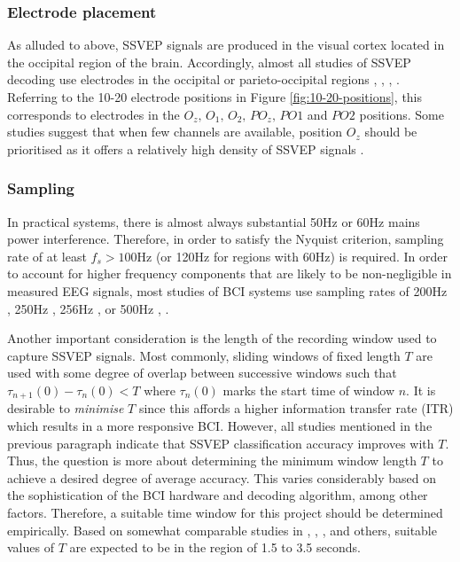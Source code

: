 \subsubsection{Electrode placement}
As alluded to above, SSVEP signals are produced in the visual cortex located in the occipital region of the brain. Accordingly, almost all studies of SSVEP decoding use electrodes in the occipital or parieto-occipital regions \cite{autthasan-single-chan-ssvep}, \cite{acampora-dataset}, \cite{chu-ssvep-colours}, \cite{chu-ssvep-colours}. Referring to the 10-20 electrode positions in Figure \ref{fig:10-20-positions}, this corresponds to electrodes in the $O_z, \, O_1,\, O_2,\, PO_z,\, PO1$ and $PO2$ positions. Some studies suggest that when few channels are available, position $O_z$ should be prioritised as it offers a relatively high density of SSVEP signals \cite{autthasan-single-chan-ssvep}.

\subsubsection{Sampling}
\label{subsection:time-frequency-considerations-c2}
In practical systems, there is almost always substantial 50Hz or 60Hz mains power interference. Therefore, in order to satisfy the Nyquist criterion, sampling rate of at least $f_s > 100$Hz (or 120Hz for regions with 60Hz) is required. In order to account for higher frequency components that are likely to be non-negligible in measured EEG signals, most studies of BCI systems use sampling rates of 200Hz \cite{peterson-bci-survey}, 250Hz \cite{zhang-mset-cca}, 256Hz \cite{miao-hybrid-cca}, \cite{nakanishi-cca-comparison} or 500Hz \cite{varnavas-phd}, \cite{duart-comparing-ssvep-stimuli}.

Another important consideration is the length of the recording window used to capture SSVEP signals. Most commonly, sliding windows of fixed length $T$ are used with some degree of overlap between successive windows such that $\tau_{n+1}{(0)} - \tau_{n}{(0)} < T$ where $\tau_n{(0)}$ marks the start time of window $n$. It is desirable to \textit{minimise} $T$ since this affords a higher information transfer rate (ITR) which results in a more responsive BCI. However, all studies mentioned in the previous paragraph indicate that SSVEP classification accuracy improves with $T$. Thus, the question is more about determining the minimum window length $T$ to achieve a desired degree of average accuracy. This varies considerably based on the sophistication of the BCI hardware and decoding algorithm, among other factors. Therefore, a suitable time window for this project should be determined empirically. Based on somewhat comparable studies in \cite{uktveris-modular-bci}, \cite{chu-ssvep-colours}, \cite{autthasan-single-chan-ssvep}, \cite{liao-gaming-control} and others, suitable values of $T$ are expected to be in the region of 1.5 to 3.5 seconds.

